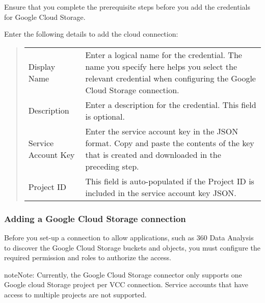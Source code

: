 \documentclass[letterpaper,10pt,english]{sphinxmanual}
\begin{document}
Ensure that you complete the prerequisite steps before you add the credentials for Google Cloud Storage.

Enter the following details to add the cloud connection:
\begin{quote}



\begin{savenotes}\sphinxattablestart
\centering
\begin{tabulary}{\linewidth}[t]{|T|T|}
\hline
{}\relax &\relax \\
\hline
Display Name
&
Enter a logical name for the credential. The name you specify here helps
you select the relevant credential when configuring the Google Cloud
Storage connection.
\\
\hline
Description
&
Enter a description for the credential. This field is optional.
\\
\hline
Service Account Key
&
Enter the service account key in the JSON format.
Copy and paste the contents of the key that is created and
downloaded in the preceding step.
\\
\hline
Project ID
&
This field is auto-populated if the Project ID is included in the
service account key JSON.
\\
\hline
\end{tabulary}
\par
\sphinxattableend\end{savenotes}
\end{quote}


\subsubsection{Adding a Google Cloud Storage connection}
\label{\detokenize{mcdmp_app_ug:adding-a-google-cloud-storage-connection}}\label{\detokenize{mcdmp_app_ug:adding-google-cloud-storage}}
Before you set-up a connection to allow applications, such as 360 Data Analysis to discover the Google Cloud Storage buckets and objects, you must configure the required permission and roles to authorize the access.

\begin{sphinxadmonition}{note}{Note:}
Currently, the Google Cloud Storage connector only supports one Google cloud Storage project per VCC connection. Service accounts that have access to multiple projects are not supported.
\end{sphinxadmonition}
\end{document}
